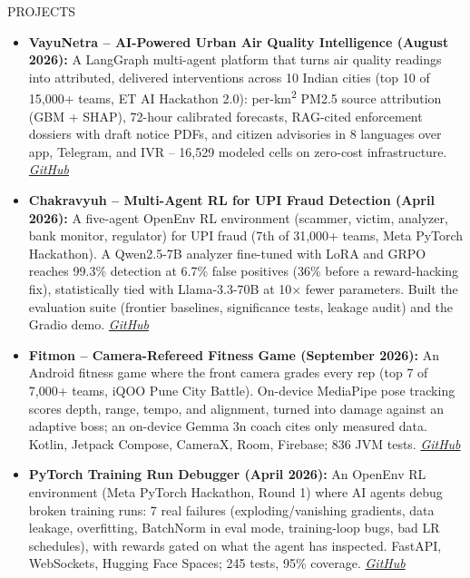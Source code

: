 \documentclass{resume} %
\begin{document}
\begin{rSection}{PROJECTS}

\begin{itemize}
\item \textbf{VayuNetra -- AI-Powered Urban Air Quality Intelligence (August 2026):} A LangGraph multi-agent platform that turns air quality readings into attributed, delivered interventions across 10 Indian cities (top 10 of 15,000+ teams, ET AI Hackathon 2.0): per-km\textsuperscript{2} PM2.5 source attribution (GBM + SHAP), 72-hour calibrated forecasts, RAG-cited enforcement dossiers with draft notice PDFs, and citizen advisories in 8 languages over app, Telegram, and IVR -- 16,529 modeled cells on zero-cost infrastructure. \href{https://github.com/omkarrr88/VayuNetra}{\textit{GitHub}}

\item \textbf{Chakravyuh -- Multi-Agent RL for UPI Fraud Detection (April 2026):} A five-agent OpenEnv RL environment (scammer, victim, analyzer, bank monitor, regulator) for UPI fraud (7th of 31,000+ teams, Meta PyTorch Hackathon). A Qwen2.5-7B analyzer fine-tuned with LoRA and GRPO reaches 99.3\% detection at 6.7\% false positives (36\% before a reward-hacking fix), statistically tied with Llama-3.3-70B at 10$\times$ fewer parameters. Built the evaluation suite (frontier baselines, significance tests, leakage audit) and the Gradio demo. \href{https://github.com/omkarrr88/Chakravyuh}{\textit{GitHub}}

\item \textbf{Fitmon -- Camera-Refereed Fitness Game (September 2026):} An Android fitness game where the front camera grades every rep (top 7 of 7,000+ teams, iQOO Pune City Battle). On-device MediaPipe pose tracking scores depth, range, tempo, and alignment, turned into damage against an adaptive boss; an on-device Gemma 3n coach cites only measured data. Kotlin, Jetpack Compose, CameraX, Room, Firebase; 836 JVM tests. \href{https://github.com/omkarrr88/ClashFit}{\textit{GitHub}}

\item \textbf{PyTorch Training Run Debugger (April 2026):} An OpenEnv RL environment (Meta PyTorch Hackathon, Round 1) where AI agents debug broken training runs: 7 real failures (exploding/vanishing gradients, data leakage, overfitting, BatchNorm in eval mode, training-loop bugs, bad LR schedules), with rewards gated on what the agent has inspected. FastAPI, WebSockets, Hugging Face Spaces; 245 tests, 95\% coverage. \href{https://github.com/omkarrr88/PyTorch-Training-Run-Debugger}{\textit{GitHub}}


\end{itemize}
\end{rSection}
\end{document}
